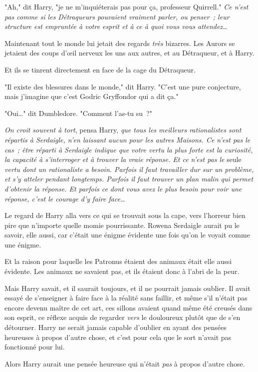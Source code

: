 "Ah," dit Harry, "je ne m'inquiéterais pas pour ça, professeur Quirrell." \emph{Ce n'est pas comme si les Détraqueurs pouvaient vraiment parler, ou penser~; leur structure est empruntée à votre esprit et à ce à quoi vous vous attendez…}

Maintenant tout le monde lui jetait des regards \emph{très} bizarres. Les Aurors se jetaient des coups d'œil nerveux les uns aux autres, et au Détraqueur, et à Harry.

Et ils se tinrent directement en face de la cage du Détraqueur.

"Il existe des blessures dans le monde," dit Harry. "C'est une pure conjecture, mais j'imagine que c'est Godric Gryffondor qui a dit ça."

"Oui…" dit Dumbledore. "Comment l'as-tu su~?"

\emph{On croit souvent à tort}, pensa Harry, \emph{que tous les meilleurs rationalistes sont répartis à Serdaigle, n'en laissant aucun pour les autres Maisons. Ce n'est pas le cas~; être réparti à Serdaigle indique que votre vertu la plus forte est la curiosité, la capacité à s'interroger et à trouver la vraie réponse. Et ce n'est pas le} seule \emph{vertu dont un rationaliste a besoin. Parfois il faut travailler dur sur un problème, et s'y atteler pendant longtemps. Parfois il faut trouver un plan malin qui permet d'obtenir la réponse. Et parfois ce dont vous avez le plus besoin pour voir une réponse, c'est le courage d'y faire face…}

Le regard de Harry alla vers ce qui se trouvait sous la cape, vers l'horreur bien pire que n'importe quelle momie pourrissante. Rowena Serdaigle aurait pu le savoir, elle aussi, car c'était une énigme évidente une fois qu'on le voyait comme une énigme.

Et la raison pour laquelle les Patronus étaient des animaux était elle aussi évidente. Les animaux ne savaient pas, et ils étaient donc à l'abri de la peur.

Mais Harry savait, et il saurait toujours, et il ne pourrait jamais oublier. Il avait essayé de s'enseigner à faire face à la réalité sans faillir, et même s'il n'était pas encore devenu maître de cet art, ces sillons avaient quand même été creusés dans son esprit, ce réflexe acquis de regarder \emph{vers} le douloureux plutôt que de s'en détourner. Harry ne serait jamais capable d'oublier en ayant des pensées heureuses à propos d'autre chose, et c'est pour cela que le sort n'avait pas fonctionné pour lui.

Alors Harry aurait une pensée heureuse qui n'était \emph{pas} à propos d'autre chose.

